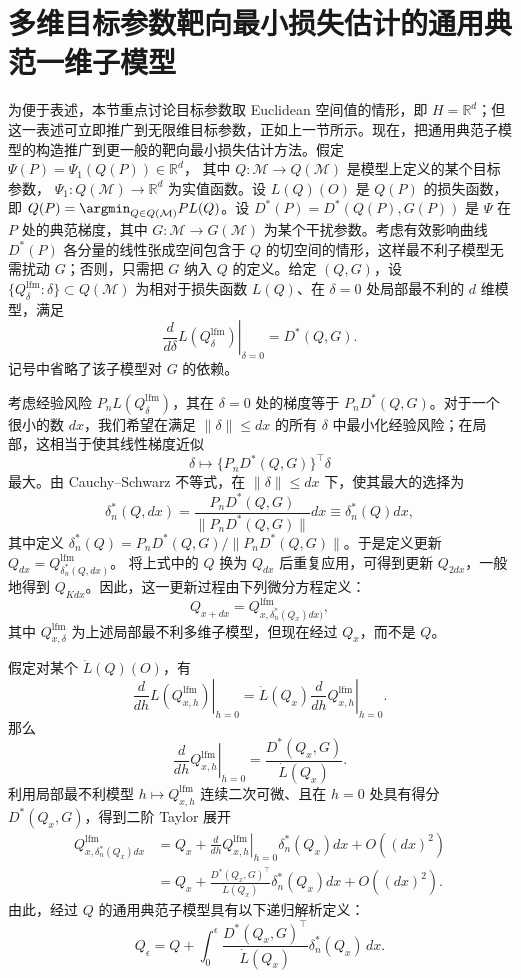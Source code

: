 \section{多维目标参数靶向最小损失估计的通用典范一维子模型}

为便于表述，本节重点讨论目标参数取 Euclidean 空间值的情形，即 $H=\mathbb R^d$；但这一表述可立即推广到无限维目标参数，正如上一节所示。现在，把通用典范子模型的构造推广到更一般的靶向最小损失估计方法。假定
$\Psi(P)=\Psi_1(Q(P))\in\mathbb R^d$，
其中 $Q:\mathcal M\to Q(\mathcal M)$ 是模型上定义的某个目标参数，
$\Psi_1:Q(\mathcal M)\to\mathbb R^d$ 为实值函数。设 $L(Q)(O)$ 是 $Q(P)$ 的损失函数，即 $Q(P)=\argmin_{Q\in Q(\mathcal M)}PL(Q)$。设
$D^*(P)=D^*(Q(P),G(P))$
是 $\Psi$ 在 $P$ 处的典范梯度，其中 $G:\mathcal M\to G(\mathcal M)$ 为某个干扰参数。考虑有效影响曲线 $D^*(P)$ 各分量的线性张成空间包含于 $Q$ 的切空间的情形，这样最不利子模型无需扰动 $G$；否则，只需把 $G$ 纳入 $Q$ 的定义。给定 $(Q,G)$，设
$\{Q_\delta^{\mathrm{lfm}}:\delta\}\subset Q(\mathcal M)$
为相对于损失函数 $L(Q)$、在 $\delta=0$ 处局部最不利的 $d$ 维模型，满足
\[
 \left.\frac{d}{d\delta}L(Q_\delta^{\mathrm{lfm}})\right|_{\delta=0}
 =D^*(Q,G).
\]
记号中省略了该子模型对 $G$ 的依赖。

考虑经验风险 $P_nL(Q_\delta^{\mathrm{lfm}})$，其在 $\delta=0$ 处的梯度等于 $P_nD^*(Q,G)$。对于一个很小的数 $dx$，我们希望在满足 $\|\delta\|\leq dx$ 的所有 $\delta$ 中最小化经验风险；在局部，这相当于使其线性梯度近似
\[
 \delta\mapsto\{P_nD^*(Q,G)\}^{\top}\delta
\]
最大。由 Cauchy--Schwarz 不等式，在 $\|\delta\|\leq dx$ 下，使其最大的选择为
\[
 \delta_n^*(Q,dx)=\frac{P_nD^*(Q,G)}{\|P_nD^*(Q,G)\|}dx
 \equiv\delta_n^*(Q)dx,
\]
其中定义 $\delta_n^*(Q)=P_nD^*(Q,G)/\|P_nD^*(Q,G)\|$。于是定义更新
$Q_{dx}=Q_{\delta_n^*(Q,dx)}^{\mathrm{lfm}}$。
将上式中的 $Q$ 换为 $Q_{dx}$ 后重复应用，可得到更新 $Q_{2dx}$，一般地得到 $Q_{Kdx}$。因此，这一更新过程由下列微分方程定义：
\[
 Q_{x+dx}=Q_{x,\delta_n^*(Q_x)dx)}^{\mathrm{lfm}},
\]
其中 $Q_{x,\delta}^{\mathrm{lfm}}$ 为上述局部最不利多维子模型，但现在经过 $Q_x$，而不是 $Q$。

假定对某个 $\dot L(Q)(O)$，有
\begin{equation}
 \left.\frac{d}{dh}L(Q_{x,h}^{\mathrm{lfm}})\right|_{h=0}
 =\dot L(Q_x)
 \left.\frac{d}{dh}Q_{x,h}^{\mathrm{lfm}}\right|_{h=0}.
 \tag{5.9}
\end{equation}
那么
\[
 \left.\frac{d}{dh}Q_{x,h}^{\mathrm{lfm}}\right|_{h=0}
 =\frac{D^*(Q_x,G)}{\dot L(Q_x)}.
\]
利用局部最不利模型 $h\mapsto Q_{x,h}^{\mathrm{lfm}}$ 连续二次可微、且在 $h=0$ 处具有得分 $D^*(Q_x,G)$，得到二阶 Taylor 展开
\[
 \begin{aligned}
 Q_{x,\delta_n^*(Q_x)dx}^{\mathrm{lfm}}
 &=Q_x+
 \left.\frac{d}{dh}Q_{x,h}^{\mathrm{lfm}}\right|_{h=0}
 \delta_n^*(Q_x)dx+O((dx)^2)\\
 &=Q_x+\frac{D^*(Q_x,G)^\top}{\dot L(Q_x)}
 \delta_n^*(Q_x)dx+O((dx)^2).
 \end{aligned}
\]
由此，经过 $Q$ 的通用典范子模型具有以下递归解析定义：
\begin{equation}
 Q_\epsilon=Q+\int_0^\epsilon
 \frac{D^*(Q_x,G)^\top}{\dot L(Q_x)}\delta_n^*(Q_x)\,dx.
 \tag{5.10}
\end{equation}

